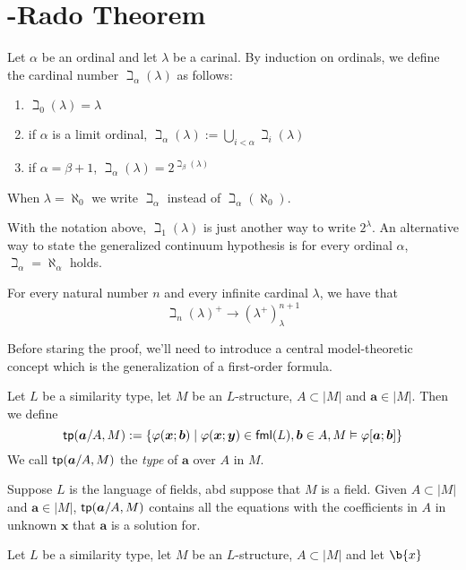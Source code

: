 \newpage
\section{\erdos-Rado Theorem}

\begin{definition}
    Let $\alpha$ be an ordinal and let $\lambda$ be a carinal. By induction on ordinals, we define the cardinal number $\beth_{\alpha}(\lambda)$ as follows:
    \begin{enumerate}
        \item $\beth_0(\lambda)=\lambda$ 
        \item if $\alpha$ is a limit ordinal, $\beth_\alpha(\lambda):=\displaystyle{\bigcup_{i<\alpha}\beth_i(\lambda)}$
        \item if $\alpha=\beta+1$, $\beth_\alpha(\lambda)=2^{\beth_\beta(\lambda)}$
    \end{enumerate}
    When $\lambda=\aleph_0$ we write $\beth_\alpha$ instead of $\beth_\alpha(\aleph_0)$.
\end{definition}

With the notation above, $\beth_1(\lambda)$ is just another way to write $2^\lambda$. An alternative way to state the generalized continuum hypothesis is for every ordinal $\alpha$, $\beth_\alpha=\aleph_\alpha$ holds.


\begin{theorem}
    For every natural number $n$ and every infinite cardinal $\lambda$, we have that
    \[
    \beth_n(\lambda)^+\to(\lambda^+)_\lambda^{n+1}
    \]
\end{theorem}

Before staring the proof, we'll need to introduce a central model-theoretic concept which is the generalization of a first-order formula. 

\begin{definition}
    Let $L$ be a similarity type, let $M$ be an $L$-structure, $A\subset |M|$ and $\boldsymbol{a}\in|M|$. Then we define
    \[
    \textsf{tp}(\boldsymbol{a}/A, M):=\{\varphi(\boldsymbol{x}; \boldsymbol{b})\mid \varphi(\boldsymbol{x};\boldsymbol{y})\in \textsf{fml}(L),\boldsymbol{b}\in A,M\vDash\varphi[\boldsymbol{a};\boldsymbol{b}]\}
    \]
    We call $\textsf{tp}(\boldsymbol{a}/A, M)$ the \emph{type} of $\boldsymbol{a}$ over $A$ in $M$.
\end{definition}


\begin{example}
    Suppose $L$ is the language of fields, abd suppose that $M$ is a field. Given $A\subset |M|$ and $\boldsymbol{a}\in |M|$, $\textsf{tp}(\boldsymbol{a}/A,M)$ contains all the equations with the coefficients in $A$ in unknown $\boldsymbol{x}$ that $\boldsymbol{a}$ is a solution for.
\end{example}

\begin{definition}
    Let $L$ be a similarity type, let $M$ be an $L$-structure, $A\subset |M|$ and let $\b{x}$
\end{definition}